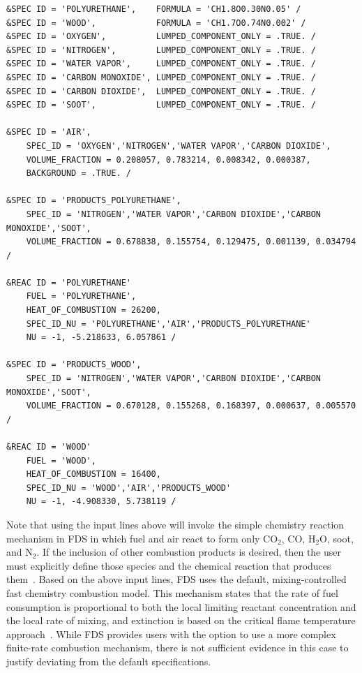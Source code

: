 \documentclass[12pt,oneside]{book}
\begin{document}
\begin{lstlisting}[basicstyle=\ttfamily\scriptsize]
&SPEC ID = 'POLYURETHANE',    FORMULA = 'CH1.8O0.30N0.05' /
&SPEC ID = 'WOOD',            FORMULA = 'CH1.7O0.74N0.002' /
&SPEC ID = 'OXYGEN',          LUMPED_COMPONENT_ONLY = .TRUE. /
&SPEC ID = 'NITROGEN',        LUMPED_COMPONENT_ONLY = .TRUE. /
&SPEC ID = 'WATER VAPOR',     LUMPED_COMPONENT_ONLY = .TRUE. /
&SPEC ID = 'CARBON MONOXIDE', LUMPED_COMPONENT_ONLY = .TRUE. /
&SPEC ID = 'CARBON DIOXIDE',  LUMPED_COMPONENT_ONLY = .TRUE. /
&SPEC ID = 'SOOT',            LUMPED_COMPONENT_ONLY = .TRUE. /

&SPEC ID = 'AIR',
    SPEC_ID = 'OXYGEN','NITROGEN','WATER VAPOR','CARBON DIOXIDE',
    VOLUME_FRACTION = 0.208057, 0.783214, 0.008342, 0.000387,
    BACKGROUND = .TRUE. /

&SPEC ID = 'PRODUCTS_POLYURETHANE',
    SPEC_ID = 'NITROGEN','WATER VAPOR','CARBON DIOXIDE','CARBON MONOXIDE','SOOT',
    VOLUME_FRACTION = 0.678838, 0.155754, 0.129475, 0.001139, 0.034794 /

&REAC ID = 'POLYURETHANE'
    FUEL = 'POLYURETHANE',
    HEAT_OF_COMBUSTION = 26200,
    SPEC_ID_NU = 'POLYURETHANE','AIR','PRODUCTS_POLYURETHANE'
    NU = -1, -5.218633, 6.057861 /

&SPEC ID = 'PRODUCTS_WOOD',
    SPEC_ID = 'NITROGEN','WATER VAPOR','CARBON DIOXIDE','CARBON MONOXIDE','SOOT',
    VOLUME_FRACTION = 0.670128, 0.155268, 0.168397, 0.000637, 0.005570 /

&REAC ID = 'WOOD'
    FUEL = 'WOOD',
    HEAT_OF_COMBUSTION = 16400,
    SPEC_ID_NU = 'WOOD','AIR','PRODUCTS_WOOD'
    NU = -1, -4.908330, 5.738119 /
\end{lstlisting}

Note that using the input lines above will invoke the simple chemistry reaction mechanism in FDS in which fuel and air react to form only CO$_2$, CO, H$_2$O, soot, and N$_2$. If the inclusion of other combustion products is desired, then the user must explicitly define those species and the chemical reaction that produces them~\cite{FDS_Users_Guide}. Based on the above input lines, FDS uses the default, mixing-controlled fast chemistry combustion model. This mechanism states that the rate of fuel consumption is proportional to both the local limiting reactant concentration and the local rate of mixing, and extinction is based on the critical flame temperature approach~\cite{FDS_Math_Guide}. While FDS provides users with the option to use a more complex finite-rate combustion mechanism, there is not sufficient evidence in this case to justify deviating from the default specifications.
\end{document}
